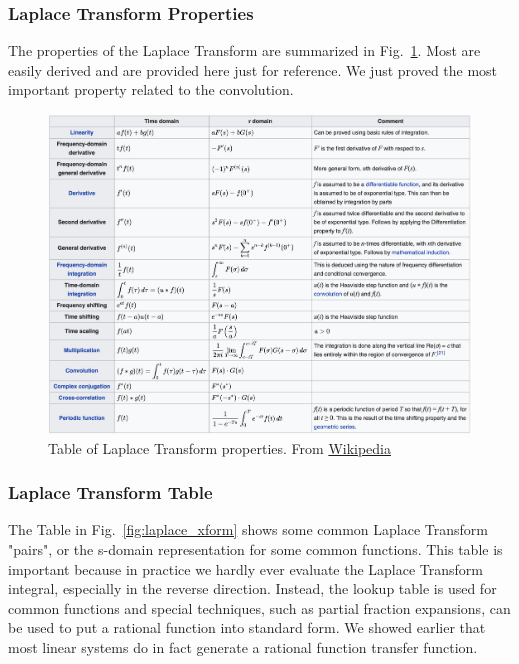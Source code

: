 


\subsubsection{Laplace Transform Properties}

The properties of the Laplace Transform are summarized in Fig.~\ref{fig:laplace_table}.   Most are easily derived and are provided here just for reference.  We just proved the most important property related to the convolution.    

\begin{figure}[tb]
\begin{center}
\includegraphics[width=.9\columnwidth]{laplace_table.png}
\end{center}
\caption{Table of Laplace Transform properties. From  \href{https://en.Wikipedia.org/wiki/Laplace_transform}{Wikipedia} }\label{fig:laplace_table}
\end{figure}
 




\subsubsection{Laplace Transform Table}

The Table in Fig.~\ref{fig:laplace_xform} shows some common Laplace Transform "pairs", or the s-domain representation for some common functions.   This table is important because in practice we hardly ever evaluate the Laplace Transform integral, especially in the reverse direction.  Instead, the lookup table is used for common functions and special techniques, such as partial fraction expansions, can be used to put a rational function into standard form.  We showed earlier that most linear systems do in fact generate a rational function transfer function.  
 

